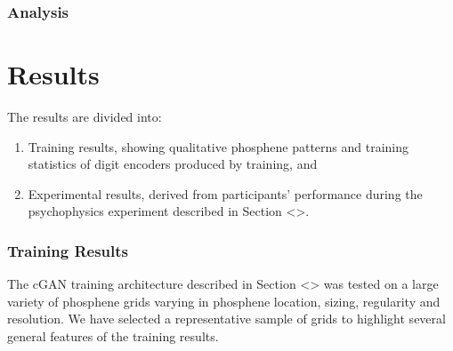 \documentclass[11pt]{book}
\begin{document}
\section*{Analysis}
\label{sec:org78ce417}

\clearpage

\part{Results}
\label{sec:org6ad2c6f}

The results are divided into:

\begin{enumerate}
\item Training results, showing qualitative phosphene patterns and training statistics of digit encoders produced by training, and
\item Experimental results, derived from participants' performance during the psychophysics experiment described in Section <>.
\end{enumerate}

\section*{Training Results}
\label{sec:org51e4b6a}

The cGAN training architecture described in Section <> was tested on a large variety of phosphene grids varying in phosphene location, sizing, regularity and resolution.
We have selected a representative sample of grids to highlight several general features of the training results.
\end{document}
